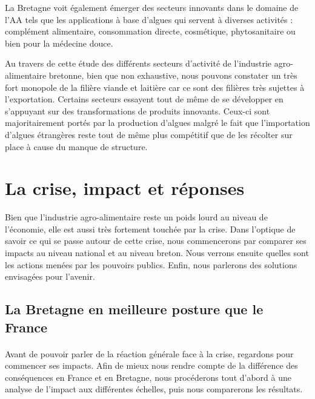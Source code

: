 \documentclass[a4paper,12pt]{report}
\begin{document}
			La Bretagne voit également émerger des secteurs innovants dans le domaine de l’AA tels que les applications à base d’algues qui servent à diverses activités\cite{CartesBretagneagro-alimentaire20142016} : complément alimentaire, consommation directe, cosmétique, phytosanitaire ou bien pour la médecine douce.
			
			Au travers de cette étude des différents secteurs d’activité de l’industrie agro-alimentaire bretonne, bien que non exhaustive, nous pouvons constater un très fort monopole de la filière viande et laitière car ce sont des filières très sujettes à l’exportation. Certains secteurs essayent tout de même de se développer en s’appuyant sur des transformations de produits innovants. Ceux-ci sont majoritairement portés par la production d’algues malgré le fait que l’importation d’algues étrangères reste tout de même plus compétitif que de les récolter sur place à cause du manque de structure.
			
			
	\section{La crise, impact et réponses}
		Bien que l'industrie agro-alimentaire reste un poids lourd au niveau de l'économie, elle est aussi très fortement touchée par la crise. Dans l’optique de savoir ce qui se passe autour de cette crise, nous commencerons par comparer ses impacts au niveau national et au niveau breton. Nous verrons ensuite quelles sont les actions menées par les pouvoirs publics. Enfin, nous parlerons des solutions envisagées pour l’avenir.
		
		\subsection{La Bretagne en meilleure posture que le France}
			\paragraph{}Avant de pouvoir parler de la réaction générale face à la crise, regardons pour commencer ses impacts. Afin de mieux nous rendre compte de la différence des conséquences en France et en Bretagne, nous procéderons tout d'abord à une analyse de l'impact aux différentes échelles, puis nous comparerons les résultats.
\end{document}
